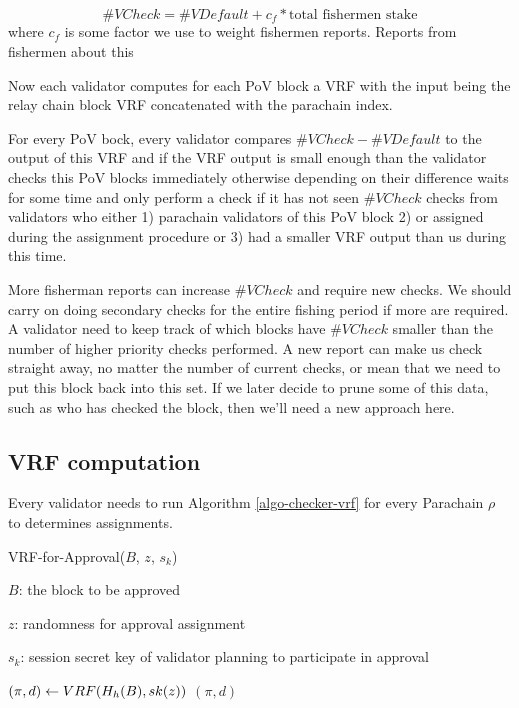 $$\#VCheck = \#VDefault + c_f * \textrm{total fishermen stake}$$
where $c_f$ is some factor we use to weight fishermen reports. Reports from fishermen about this 

Now each validator computes for each PoV block a VRF with the input being the relay chain block VRF concatenated with the parachain index. 

For every PoV bock, every validator compares $\#VCheck - \#VDefault$ to the output of this VRF and if the VRF output is small enough than the validator checks this PoV blocks immediately otherwise depending on their difference waits for some time and only perform a check if it has not seen $\#VCheck$ checks from validators who either 1) parachain validators of this PoV block 2) or assigned during the assignment procedure or 3) had a smaller VRF output than us during this time.

More fisherman reports can increase $\#VCheck$ and require new checks. We should carry on doing secondary checks for the entire fishing period if more are required. A validator need to keep track of which blocks have $\#VCheck$ smaller than the number of higher priority checks performed. A new report can make us check straight away, no matter the number of current checks, or mean that we need to put this block back into this set. If we later decide to prune some of this data, such as who has checked the block, then we'll need a new approach here.

\subsection{VRF computation}

Every validator needs to run Algorithm \ref{algo-checker-vrf} for every Parachain $\rho$ to determines assignments.  

\begin{algorithm}
  \caption[VRF-for-Approval]{\sc VRF-for-Approval($B$, $z$, $s_k$)}
  \label{algo-checker-vrf}
  \begin{algorithmic}[1]
  \Require

    $B$: the block to be approved 

    $z$: randomness for approval assignment

    $s_k$: session secret key of validator planning to participate in approval

    \State $(\pi, d) \leftarrow {\sc VRF}(H_h(B),sk(z))$
    \State \Return $(\pi,d)$
  \end{algorithmic}
\end{algorithm}


